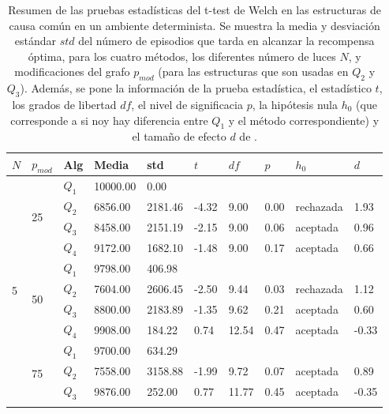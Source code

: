 \clearpage

\begin{table}[]
\centering
\caption{Resumen de las pruebas estadísticas del t-test de Welch en las
estructuras de causa común en un ambiente determinista. Se muestra la media y desviación estándar $std$ del número 
de episodios que tarda en alcanzar la recompensa óptima, para los cuatro métodos, los diferentes número de luces $N$, y modificaciones del grafo $p_{mod}$ (para las estructuras que son usadas en $Q_2$ y $Q_3$). Además, se pone la información
de la prueba estadística, el estadístico $t$, los grados de libertad $df$, el nivel
de significacia $p$, la hipótesis nula $h_0$ (que corresponde a si noy hay diferencia entre $Q_1$ y el método correspondiente) y el tamaño de efecto $d$ de \citet{cohen2013statistical}.}
\label{tab:common-cause-pmod-det}
\begin{tabular}{|l|l|l|l|l|l|l|l|l|l|}
\hline
$N$ & $p_{mod}$ & Alg & Media & std & $t$ & $df$ & $p$ & $h_0$ & $d$ \\ \hline
\multirow{12}{*}{5} & \multirow{4}{*}{25} & $Q_1$ & 10000.00 & 0.00 & \multicolumn{5}{l|}{} \\ \cline{3-10} 
 &  & $Q_2$ & 6856.00 & 2181.46 & -4.32 & 9.00 & 0.00 & rechazada & 1.93 \\ \cline{3-10} 
 &  & $Q_3$ & 8458.00 & 2151.19 & -2.15 & 9.00 & 0.06 & aceptada & 0.96 \\ \cline{3-10} 
 &  & $Q_4$ & 9172.00 & 1682.10 & -1.48 & 9.00 & 0.17 & aceptada & 0.66 \\ \cline{2-10} 
 & \multirow{4}{*}{50} & $Q_1$ & 9798.00 & 406.98 & \multicolumn{5}{l|}{} \\ \cline{3-10} 
 &  & $Q_2$ & 7604.00 & 2606.45 & -2.50 & 9.44 & 0.03 & rechazada & 1.12 \\ \cline{3-10} 
 &  & $Q_3$ & 8800.00 & 2183.89 & -1.35 & 9.62 & 0.21 & aceptada & 0.60 \\ \cline{3-10} 
 &  & $Q_4$ & 9908.00 & 184.22 & 0.74 & 12.54 & 0.47 & aceptada & -0.33 \\ \cline{2-10} 
 & \multirow{4}{*}{75} & $Q_1$ & 9700.00 & 634.29 & \multicolumn{5}{l|}{} \\ \cline{3-10} 
 &  & $Q_2$ & 7558.00 & 3158.88 & -1.99 & 9.72 & 0.07 & aceptada & 0.89 \\ \cline{3-10} 
 &  & $Q_3$ & 9876.00 & 252.00 & 0.77 & 11.77 & 0.45 & aceptada & -0.35 \\ \cline{3-10} 

\end{tabular}
\end{table}
